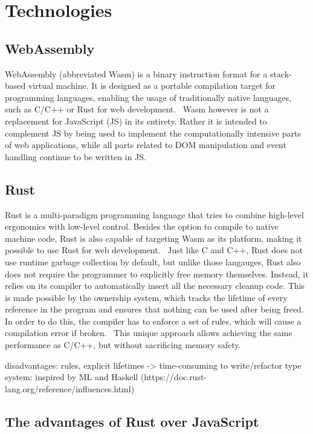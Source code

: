 \section {Technologies}

\subsection{WebAssembly}

WebAssembly (abbreviated Wasm) is a binary instruction format for a stack-based virtual machine. It is designed as a portable compilation target for programming languages, enabling the usage of traditionally native languages, such as C/C++ or Rust for web development.~\cite{wasmweb}
Wasm however is not a replacement for JavaScript (JS) in its entirety. Rather it is intended to complement JS by being used to implement the computationally intensive parts of web applications, while all parts related to DOM manipulation and event handling continue to be written in JS.~\cite{wasmmdn}

\subsection{Rust}

Rust is a multi-paradigm programming language that tries to combine high-level ergonomics with low-level control. \cite[Introduction]{klabnik2019rust}
Besides the option to compile to native machine code, Rust is also capable of targeting Wasm as its platform, making it possible to use Rust for web development.~\cite{rustwasm}
Just like C and C++, Rust does not use runtime garbage collection by default, but unlike those langauges, Rust also does not require the programmer to explicitly free memory themselves.
Instead, it relies on its compiler to automatically insert all the necessary cleanup code. This is made possible by the ownership system, which tracks the lifetime of every reference in the program and ensures that nothing can be used after being freed.
In order to do this, the compiler has to enforce a set of rules, which will cause a compilation error if broken.~\cite[Chapter~4]{klabnik2019rust}
This unique approach allows achieving the same performance as C/C++, but without sacrificing memory safety.

disadvantages: rules, explicit lifetimes -> time-consuming to write/refactor
type system: inspired by ML and Haskell (https://doc.rust-lang.org/reference/influences.html)

\subsection{The advantages of Rust over JavaScript}


